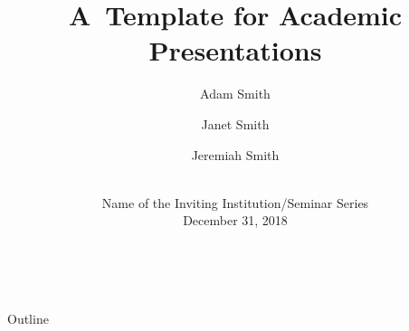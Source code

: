 \newcommand{\balA}[1][1]{BAL$^\mathup{I}_{#1:#1}$\xspace}
\newcommand{\unbalA}[1][n]{UNBAL$^\mathup{I}_{1:#1}$\xspace}
\newcommand{\balB}[1][1]{BAL$^\mathup{II}_{#1:#1}$\xspace}
\newcommand{\unbalB}[1][n]{UNBAL$^\mathup{II}_{#1:1}$\xspace}



\title{A~Template for Academic Presentations}

\author[Smith, Smith, and Smith]{%
	Adam Smith \and
	\alert{Janet Smith} \and
	Jeremiah Smith
} %


\date{%
	\\
	Name of the Inviting Institution/Seminar Series \\[\medskipamount]
	\textmd{December 31, 2018}%
}






\renewcommand{\euro}{\texteuro}

\begin{frame}[standout]{~}

	\Wider{%
		\titlepage%
	}

\end{frame}



\begin{frame}[standout]{Outline}

	\medskip
	\tableofcontents

\end{frame}






